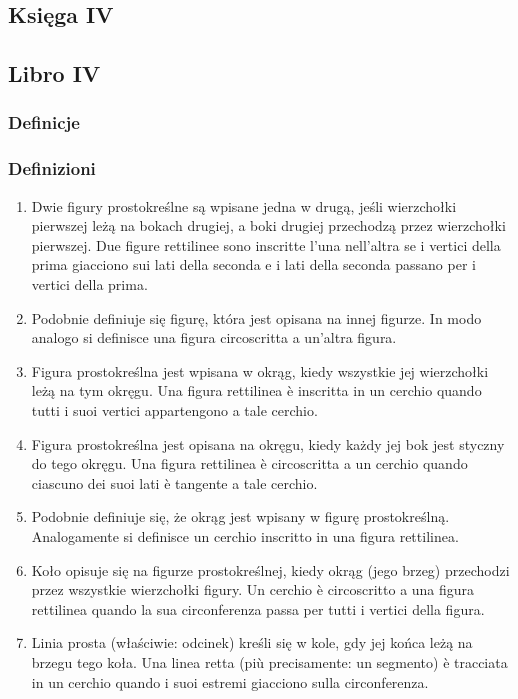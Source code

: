 %

\subsection{Księga IV} %
\subsection{Libro IV} %
\subsubsection{Definicje} %
\subsubsection{Definizioni} %
\begin{enumerate}
	\item [4.1]
	Dwie figury prostokreślne są wpisane jedna w drugą, jeśli wierzchołki pierwszej leżą na bokach drugiej, a boki drugiej przechodzą przez wierzchołki pierwszej. %
	Due figure rettilinee sono inscritte l'una nell'altra se i vertici della prima giacciono sui lati della seconda e i lati della seconda passano per i vertici della prima. %
	\item [4.2]
	Podobnie definiuje się figurę, która jest opisana na innej figurze. %
	In modo analogo si definisce una figura circoscritta a un'altra figura. %
	\item [4.3]
	Figura prostokreślna jest wpisana w okrąg, kiedy wszystkie jej wierzchołki leżą na tym okręgu. %
	Una figura rettilinea è inscritta in un cerchio quando tutti i suoi vertici appartengono a tale cerchio. %
	\item [4.4]
	Figura prostokreślna jest opisana na okręgu, kiedy każdy jej bok jest styczny do tego okręgu. %
	Una figura rettilinea è circoscritta a un cerchio quando ciascuno dei suoi lati è tangente a tale cerchio. %
	\item [4.5]
	Podobnie definiuje się, że okrąg jest wpisany w figurę prostokreślną. %
	Analogamente si definisce un cerchio inscritto in una figura rettilinea. %
	\item [4.6]
	Koło opisuje się na figurze prostokreślnej, kiedy okrąg (jego brzeg) przechodzi przez wszystkie wierzchołki figury. %
	Un cerchio è circoscritto a una figura rettilinea quando la sua circonferenza passa per tutti i vertici della figura. %
	\item [4.7]
	Linia prosta (właściwie: odcinek) kreśli się w kole, gdy jej końca leżą na brzegu tego koła. %
	Una linea retta (più precisamente: un segmento) è tracciata in un cerchio quando i suoi estremi giacciono sulla circonferenza. %
\end{enumerate}

